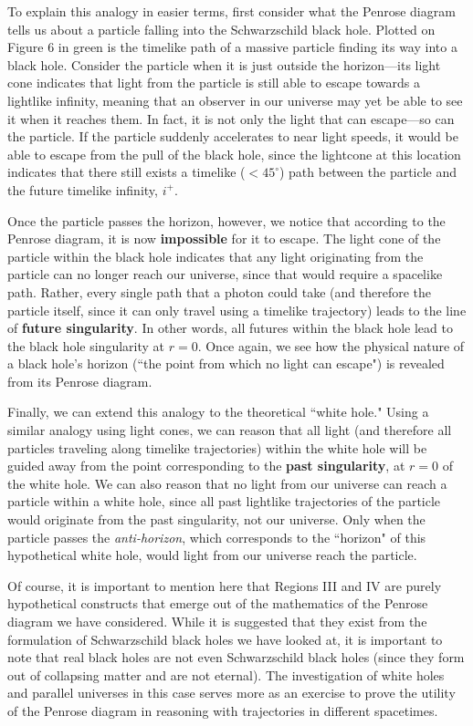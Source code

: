 \documentclass{article}
\begin{document}
To explain this analogy in easier terms, first consider what the Penrose diagram tells us about a particle falling into the Schwarzschild black hole. Plotted on Figure 6 in green is the timelike path of a massive particle finding its way into a black hole. Consider the particle when it is just outside the horizon---its light cone indicates that light from the particle is still able to escape towards a lightlike infinity, meaning that an observer in our universe may yet be able to see it when it reaches them. In fact, it is not only the light that can escape---so can the particle. If the particle suddenly accelerates to near light speeds, it would be able to escape from the pull of the black hole, since the lightcone at this location indicates that there still exists a timelike ($<45^{\circ}$) path between the particle and the future timelike infinity, $i^+$.

Once the particle passes the horizon, however, we notice that according to the Penrose diagram, it is now \textbf{impossible} for it to escape. The light cone of the particle within the black hole indicates that any light originating from the particle can no longer reach our universe, since that would require a spacelike path. Rather, every single path that a photon could take (and therefore the particle itself, since it can only travel using a timelike trajectory) leads to the line of \textbf{future singularity}. In other words, all futures within the black hole lead to the black hole singularity at $r=0$. Once again, we see how the physical nature of a black hole's horizon (``the point from which no light can escape") is revealed from its Penrose diagram.

Finally, we can extend this analogy to the theoretical ``white hole." Using a similar analogy using light cones, we can reason that all light (and therefore all particles traveling along timelike trajectories) within the white hole will be guided away from the point corresponding to the \textbf{past singularity}, at $r=0$ of the white hole. We can also reason that no light from our universe can reach a particle within a white hole, since all past lightlike trajectories of the particle would originate from the past singularity, not our universe. Only when the particle passes the \textit{anti-horizon}, which corresponds to the ``horizon" of this hypothetical white hole, would light from our universe reach the particle.

Of course, it is important to mention here that Regions III and IV are purely hypothetical constructs that emerge out of the mathematics of the Penrose diagram we have considered. While it is suggested that they exist from the formulation of Schwarzschild black holes we have looked at, it is important to note that real black holes are not even Schwarzschild black holes (since they form out of collapsing matter and are not eternal). The investigation of white holes and parallel universes in this case serves more as an exercise to prove the utility of the Penrose diagram in reasoning with trajectories in different spacetimes. 
\end{document}
